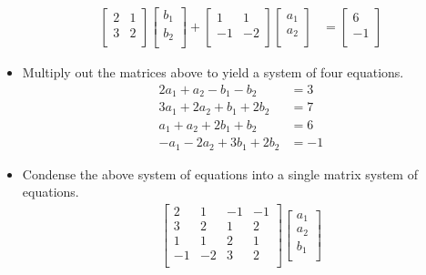 \documentclass{article}
\begin{document}
\begin{itemize}
\begin{align*}
        \begin{bmatrix}
            2 & 1\\
            3 & 2\\
        \end{bmatrix}
        \begin{bmatrix}
            b_1\\
            b_2\\
        \end{bmatrix}
        +
        \begin{bmatrix}
            1 & 1\\
            -1 & -2\\
        \end{bmatrix}
        \begin{bmatrix}
            a_1\\
            a_2\\
        \end{bmatrix}
        &=
        \begin{bmatrix}
            6\\
            -1\\
        \end{bmatrix}
    \end{align*}
    \item Multiply out the matrices above to yield a system of four equations.
    \begin{align*}
        2a_1+a_2-b_1-b_2 &= 3\\
        3a_1+2a_2+b_1+2b_2 &= 7\\
        a_1+a_2+2b_1+b_2 &= 6\\
        -a_1-2a_2+3b_1+2b_2 &= -1
    \end{align*}
    \item Condense the above system of equations into a single matrix system of equations.
    \begin{align*}
        \begin{bmatrix}
            2 & 1 & -1 & -1\\
            3 & 2 & 1 & 2\\
            1 & 1 & 2 & 1\\
            -1 & -2 & 3 & 2\\
        \end{bmatrix}
        \begin{bmatrix}
            a_1\\
            a_2\\
            b_1\\

\end{bmatrix}
\end{align*}
\end{itemize}
\end{document}
